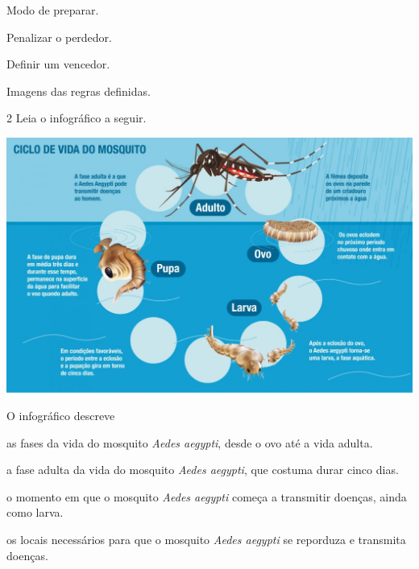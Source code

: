 \begin{myquote}
\begin{myescolha}
\begin{escolha}
\item Modo de preparar.

\item Penalizar o perdedor.

\item Definir um vencedor.

\item Imagens das regras definidas.
\end{escolha}

\num{2} Leia o infográfico a seguir.

\begin{myquote}

\includegraphics[width=\textwidth]{media/image37.jpeg}

\end{myquote}

O infográfico descreve

\begin{escolha}
\item as fases da vida do mosquito \emph{Aedes aegypti}, desde o ovo até a vida adulta.

\item a fase adulta da vida do mosquito \emph{Aedes aegypti}, que costuma durar cinco dias.

\item o momento em que o mosquito \emph{Aedes aegypti} começa a transmitir doenças, ainda como larva.

\item os locais necessários para que o mosquito \emph{Aedes aegypti} se reporduza e transmita doenças.
\end{escolha}


\end{myescolha}
\end{myquote}
